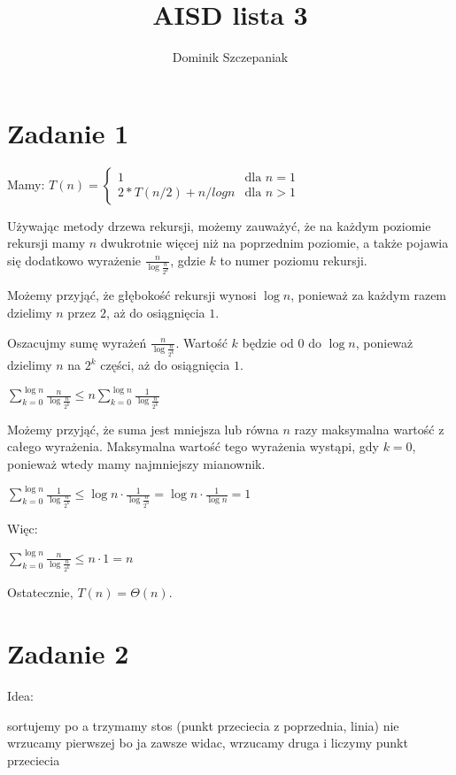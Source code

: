 \documentclass[12pt]{article}
\title{AISD lista 3}
\author{Dominik Szczepaniak}
\begin{document}
\maketitle

\bgroup\obeylines



\section{Zadanie 1}
Mamy:
$T(n) = \begin{cases}
    1 & \text{dla } n = 1\\
    2*T(n/2) + n / logn & \text{dla } n > 1
\end{cases}$


Używając metody drzewa rekursji, możemy zauważyć, że na każdym poziomie rekursji mamy $n$ dwukrotnie więcej niż na poprzednim poziomie, a także pojawia się dodatkowo wyrażenie $\frac{n}{\log\frac{n}{2^k}}$, gdzie $k$ to numer poziomu rekursji.

Możemy przyjąć, że głębokość rekursji wynosi $\log n$, ponieważ za każdym razem dzielimy $n$ przez $2$, aż do osiągnięcia $1$.

Oszacujmy sumę wyrażeń $\frac{n}{\log\frac{n}{2^k}}$. Wartość $k$ będzie od $0$ do $\log n$, ponieważ dzielimy $n$ na $2^k$ części, aż do osiągnięcia $1$.


$\sum_{k=0}^{\log n} \frac{n}{\log\frac{n}{2^k}} \leq n \sum_{k=0}^{\log n} \frac{1}{\log\frac{n}{2^k}}$


Możemy przyjąć, że suma jest mniejsza lub równa $n$ razy maksymalna wartość z całego wyrażenia. Maksymalna wartość tego wyrażenia wystąpi, gdy $k = 0$, ponieważ wtedy mamy najmniejszy mianownik.


$\sum_{k=0}^{\log n} \frac{1}{\log\frac{n}{2^k}} \leq \log n \cdot \frac{1}{\log\frac{n}{2^0}} = \log n \cdot \frac{1}{\log n} = 1$


Więc:


$\sum_{k=0}^{\log n} \frac{n}{\log\frac{n}{2^k}} \leq n \cdot 1 = n$

Ostatecznie, $T(n) = \Theta(n)$.



\section{Zadanie 2}
Idea:

sortujemy po a
trzymamy stos (punkt przeciecia z poprzednia, linia)
nie wrzucamy pierwszej bo ja zawsze widac, wrzucamy druga i liczymy punkt przeciecia
\end{document}
